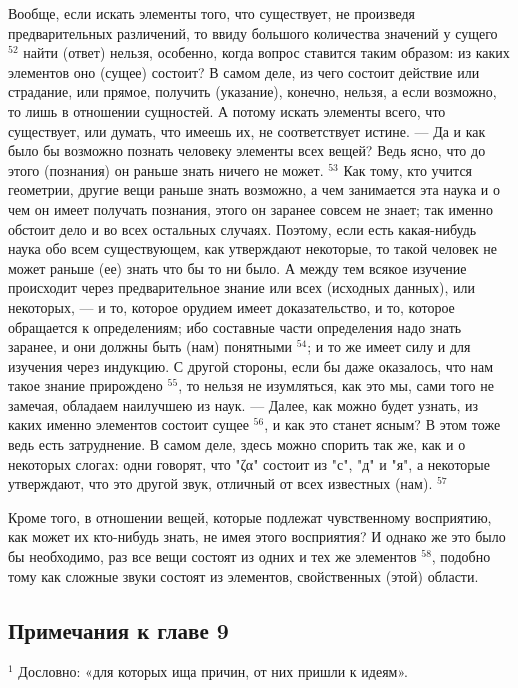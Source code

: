 \documentclass[oneside, 17pt, dvipsnames]{extbook}
\begin{document}
Вообще, если искать элементы того, что существует, не произведя предварительных различений, то ввиду большого количества значений у сущего $^{52}$ найти (ответ) нельзя, особенно, когда вопрос ставится таким образом: из каких элементов оно (сущее) состоит? В самом деле, из чего состоит действие или страдание, или прямое, получить (указание), конечно, нельзя, а если возможно, то лишь в отношении сущностей.  А потому искать элементы всего, что существует, или думать, что имеешь их, не соответствует истине. — Да и как было бы возможно познать человеку элементы всех вещей? Ведь ясно, что до этого (познания) он раньше знать ничего не может. $^{53}$ Как тому, кто учится геометрии, другие вещи раньше знать возможно, а чем занимается эта наука и о чем он имеет получать познания, этого он заранее совсем не знает; так именно обстоит дело и во всех остальных случаях. Поэтому, если есть какая-нибудь наука обо всем существующем, как утверждают некоторые, то такой человек не может раньше (ее) знать что бы то ни было. А между тем всякое изучение происходит через предварительное знание или всех (исходных данных), или некоторых, — и то, которое орудием имеет доказательство, и то, которое обращается к определениям; ибо составные части определения надо знать заранее, и они должны быть (нам) понятными $^{54}$; и то же имеет силу и для изучения через индукцию. С другой стороны, если бы даже оказалось, что нам такое знание прирождено $^{55}$, то нельзя не изумляться, как это мы, сами того не замечая, обладаем наилучшею из наук. — Далее, как можно будет узнать, из каких именно элементов состоит сущее $^{56}$, и как это станет ясным? В этом тоже ведь есть затруднение. В самом деле, здесь можно спорить так же, как и о некоторых слогах: одни говорят, что "ζα" состоит из "с", "д" и "я", а некоторые утверждают, что это другой звук, отличный от всех известных (нам). $^{57}$

Кроме того, в отношении вещей, которые подлежат чувственному восприятию, как может их кто-нибудь знать, не имея этого восприятия? И однако же это было бы необходимо, раз все вещи состоят из одних и тех же элементов $^{58}$, подобно тому как сложные звуки состоят из элементов, свойственных (этой) области.



\subsection{Примечания к главе 9}

$^1$ Дословно: «для которых ища причин, от них пришли к идеям».
\end{document}
